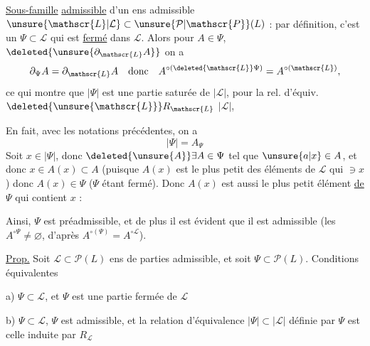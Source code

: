  \uline{Sous-famille}  \uline{admissible} d'un ens admissible $\unsure{\mathscr{L}|\mathcal{L}}\subset\unsure{\mathcal{P}|\mathscr{P}}(L)$ : par définition, c'est un $\Psi\subset\mathscr{L}$ qui est \uline{fermé} dans $\mathscr{L}$. Alors pour $A\in\Psi$, $\deleted{\unsure{\partial_{\mathscr{L}}A}}$ on a
\[
 \partial_{\Psi}A=\partial_{\mathscr{L}}A\quad\text{donc}\quad
 A^{\circ(\deleted{\mathscr{L}}\Psi)}=A^{\circ(\mathscr{L})},
\]
ce qui montre que $|\Psi|$ est une partie saturée de $|\mathscr{L}|$, pour la rel. d'équiv. $\deleted{\unsure{\mathscr{L}}}R_{\mathscr{L}}$  $|\mathscr{L}|$,

En fait, avec les notations précédentes, on a
\[
 |\Psi|=A_\Psi
\]
 Soit $x\in|\Psi|$, donc $\deleted{\unsure{A}}\exists A\in\Psi$ tel que $\unsure{a|x}\in A$,  et donc $x\in A(x)\subset A$ (puisque $A(x)$ est le plus petit des éléments de $\mathscr{L}$ qui $\ni x$) donc $A(x)\in\Psi$ ($\Psi$ étant fermé). Donc $A(x)$ est aussi le plus petit élément \uline{de $\Psi$} qui contient $x$ :

 Ainsi, $\Psi$ est préadmissible, et de plus il est évident que il est admissible (les $A^{\circ\Psi}\ne\varnothing$, d'après $A^{\circ(\Psi)}=A^{\circ\mathscr{L}}$).

\uline{Prop.} Soit $\mathscr{L}\subset\mathcal{P}(L)$ ens de parties admissible, et soit $\Psi\subset\mathcal{P}(L)$. Conditions équivalentes

a) $\Psi\subset\mathscr{L}$, et $\Psi$ est une partie fermée de $\mathscr{L}$

b) $\Psi\subset\mathscr{L}$, $\Psi$ est admissible,  et la relation d'équivalence   $|\Psi|\subset|\mathscr{L}|$ définie par $\Psi$ est celle induite par $R_{\mathscr{L}}$
